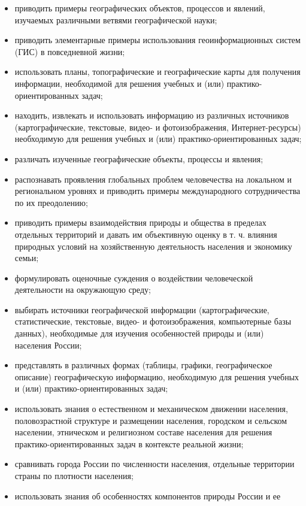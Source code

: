 \documentclass[
  11pt,
  russian,
]{book}
\begin{document}
\begin{itemize}
\item
  приводить примеры географических объектов, процессов и явлений,
  изучаемых различными ветвями географической науки;
\item
  приводить элементарные примеры использования геоинформационных систем
  (ГИС) в повседневной жизни;
\item
  использовать планы, топографические и географические карты для
  получения информации, необходимой для решения учебных и (или)
  практико-ориентированных задач;
\item
  находить, извлекать и использовать информацию из различных источников
  (картографические, текстовые, видео- и фотоизображения,
  Интернет-ресурсы) необходимую для решения учебных и (или)
  практико-ориентированных задач;
\item
  различать изученные географические объекты, процессы и явления;
\item
  распознавать проявления глобальных проблем человечества на локальном и
  региональном уровнях и приводить примеры международного сотрудничества
  по их преодолению;
\item
  приводить примеры взаимодействия природы и общества в пределах
  отдельных территорий и давать им объективную оценку в т. ч. влияния
  природных условий на хозяйственную деятельность населения и экономику
  семьи;
\item
  формулировать оценочные суждения о воздействии человеческой
  деятельности на окружающую среду;
\item
  выбирать источники географической информации (картографические,
  статистические, текстовые, видео- и фотоизображения, компьютерные базы
  данных), необходимые для изучения особенностей природы и (или)
  населения России;
\item
  представлять в различных формах (таблицы, графики, географическое
  описание) географическую информацию, необходимую для решения учебных и
  (или) практико-ориентированных задач;
\item
  использовать знания о естественном и механическом движении населения,
  половозрастной структуре и размещении населения, городском и сельском
  населении, этническом и религиозном составе населения для решения
  практико-ориентированных задач в контексте реальной жизни;
\item
  сравнивать города России по численности населения, отдельные
  территории страны по плотности населения;
\item
  использовать знания об особенностях компонентов природы России и ее

\end{itemize}
\end{document}
